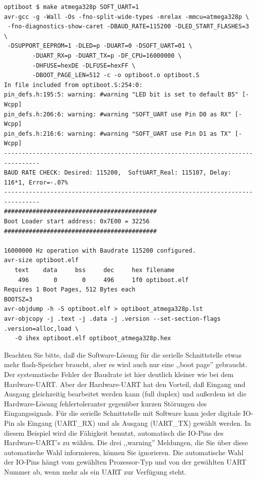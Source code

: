 \begin{verbatim}
optiboot $ make atmega328p SOFT_UART=1
avr-gcc -g -Wall -Os -fno-split-wide-types -mrelax -mmcu=atmega328p \
 -fno-diagnostics-show-caret -DBAUD_RATE=115200 -DLED_START_FLASHES=3 \
 -DSUPPORT_EEPROM=1 -DLED=p -DUART=0 -DSOFT_UART=01 \
        -DUART_RX=p -DUART_TX=p -DF_CPU=16000000 \
        -DHFUSE=hexDE -DLFUSE=hexFF \
        -DBOOT_PAGE_LEN=512 -c -o optiboot.o optiboot.S
In file included from optiboot.S:254:0:
pin_defs.h:195:5: warning: #warning "LED bit is set to default B5" [-Wcpp]
pin_defs.h:206:6: warning: #warning "SOFT_UART use Pin D0 as RX" [-Wcpp]
pin_defs.h:216:6: warning: #warning "SOFT_UART use Pin D1 as TX" [-Wcpp]
--------------------------------------------------------------------------------
BAUD RATE CHECK: Desired: 115200,  SoftUART_Real: 115107, Delay: 116*1, Error=-.07%
--------------------------------------------------------------------------------
###########################################
Boot Loader start address: 0x7E00 = 32256
###########################################

16000000 Hz operation with Baudrate 115200 configured.
avr-size optiboot.elf
   text	   data	    bss	    dec	    hex	filename
    496	      0	      0	    496	    1f0	optiboot.elf
Requires 1 Boot Pages, 512 Bytes each
BOOTSZ=3
avr-objdump -h -S optiboot.elf > optiboot_atmega328p.lst
avr-objcopy -j .text -j .data -j .version --set-section-flags .version=alloc,load \
   -O ihex optiboot.elf optiboot_atmega328p.hex
\end{verbatim}

Beachten Sie bitte, daß die Software-Lösung für die serielle Schnittstelle etwas mehr flash-Speicher braucht,
aber es wird auch nur eine ,,boot page'' gebraucht. Der systematische Fehler der Baudrate ist hier deutlich kleiner
wie bei dem Hardware-UART.
Aber der Hardware-UART hat den Vorteil, daß Eingang und Ausgang gleichzeitig bearbeitet werden kann (full duplex) und 
außerdem ist die Hardware-Lösung fehlertoleranter gegenüber kurzen Störungen des Eingangssignals.
Für die serielle Schnittstelle mit Software kann jeder digitale IO-Pin als Eingang (UART\_RX) und als Ausgang (UART\_TX)
gewählt werden. In diesem Beispiel wird die Fähigkeit benutzt, automatisch die IO-Pins des Hardware-UART's zu wählen.
Die drei ,,warning'' Meldungen, die Sie über diese automatische Wahl informieren, können Sie ignorieren.
Die automatische Wahl der IO-Pins hängt vom gewählten Prozessor-Typ und von der gewählten UART Nummer ab,
wenn mehr als ein UART zur Verfügung steht.

